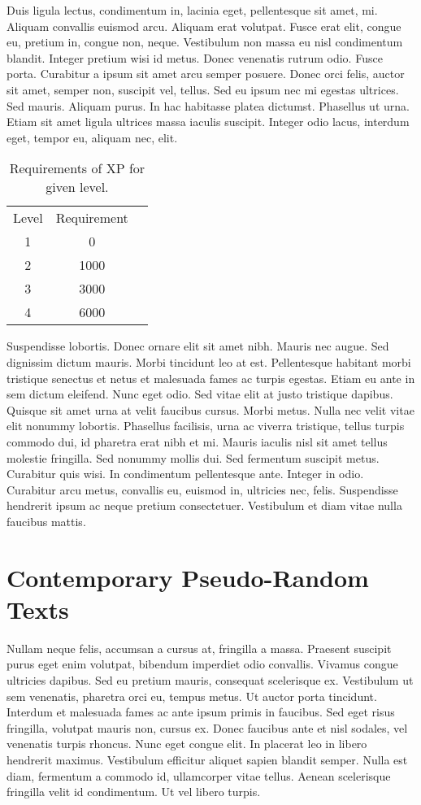 \documentclass[thesismargins, english, thesislinespacing, twoside, openright, upjsfrontpage]{rnthesis}
\begin{document}
Duis ligula lectus, condimentum in, lacinia eget, pellentesque sit
amet, mi. Aliquam convallis euismod arcu. Aliquam erat volutpat.
Fusce erat elit, congue eu, pretium in, congue non, neque.
Vestibulum non massa eu nisl condimentum blandit. Integer pretium
wisi id metus. Donec venenatis rutrum odio. Fusce porta. Curabitur
a ipsum sit amet arcu semper posuere. Donec orci felis, auctor sit
amet, semper non, suscipit vel, tellus. Sed eu ipsum nec mi egestas
ultrices. Sed mauris. Aliquam purus. In hac habitasse platea
dictumst. Phasellus ut urna. Etiam sit amet ligula ultrices massa
iaculis suscipit. Integer odio lacus, interdum eget, tempor eu,
aliquam nec, elit.

\begin{table}
\begin{center}
\begin{tabular}{ccc}
Level & Requirement\\
1 & 0\\
2 & 1000\\
3 & 3000\\
4 & 6000
\end{tabular}
\end{center}
\caption{Requirements of XP for given level.}
\end{table}
Suspendisse lobortis. Donec ornare elit sit amet nibh. Mauris nec
augue. Sed dignissim dictum mauris. Morbi tincidunt leo at est.
Pellentesque habitant morbi tristique senectus et netus et
malesuada fames ac turpis egestas. Etiam eu ante in sem dictum
eleifend. Nunc eget odio. Sed vitae elit at justo tristique
dapibus. Quisque sit amet urna at velit faucibus cursus.
Morbi metus. Nulla nec velit vitae elit
nonummy lobortis. Phasellus facilisis, urna ac viverra tristique,
tellus turpis commodo dui, id pharetra erat nibh et mi. Mauris
iaculis nisl sit amet tellus molestie fringilla. Sed nonummy mollis
dui. Sed fermentum suscipit metus. Curabitur quis wisi. In
condimentum pellentesque ante. Integer in odio. Curabitur arcu
metus, convallis eu, euismod in, ultricies nec, felis. Suspendisse
hendrerit ipsum ac neque pretium consectetuer. Vestibulum et diam
vitae nulla faucibus mattis. 


\chapter{Contemporary Pseudo-Random Texts}

Nullam neque felis, accumsan a cursus at, fringilla a massa. Praesent suscipit purus eget enim volutpat, bibendum imperdiet odio convallis. Vivamus congue ultricies dapibus. Sed eu pretium mauris, consequat scelerisque ex. Vestibulum ut sem venenatis, pharetra orci eu, tempus metus. Ut auctor porta tincidunt. Interdum et malesuada fames ac ante ipsum primis in faucibus. Sed eget risus fringilla, volutpat mauris non, cursus ex. Donec faucibus ante et nisl sodales, vel venenatis turpis rhoncus. Nunc eget congue elit. In placerat leo in libero hendrerit maximus. Vestibulum efficitur aliquet sapien blandit semper. Nulla est diam, fermentum a commodo id, ullamcorper vitae tellus. Aenean scelerisque fringilla velit id condimentum. Ut vel libero turpis.
\end{document}
